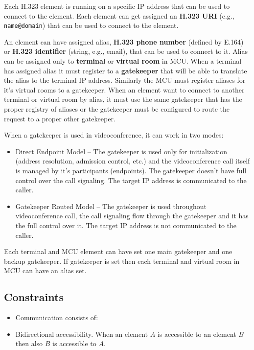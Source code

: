 Each H.323 element is running on a specific IP address that can be used to 
connect to the element. Each element can get assigned an \textbf{H.323 URI} (e.g., \verb|name@domain|) that can be used to connect to the element.

An element can have assigned alias, \textbf{H.323 
phone number} (defined by E.164) or \textbf{H.323 identifier} (string, e.g., 
email), that can be used to connect to it. Alias can be assigned only to \textbf{terminal} or \textbf{virtual room} in 
MCU. When a terminal has assigned alias it must register to a 
\textbf{gatekeeper} that will be able to translate the alias to the terminal 
IP address. Similarly the MCU must register aliases for it's virtual rooms to 
a gatekeeper. When an element want to connect to another terminal or virtual 
room by alias, it must use the same gatekeeper that has the proper registry 
of aliases or the gatekeeper must be configured to route the request to a 
proper other gatekeeper.

When a gatekeeper is used in videoconference, it can work in two modes:
\begin{itemize}
\item Direct Endpoint Model -- The gatekeeper is used only for initialization 
(address resolution, admission control, etc.) and the videoconference call 
itself is managed by it's participants (endpoints). The gatekeeper doesn't 
have full control over the call signaling. The target IP address is 
communicated to the caller.
\item Gatekeeper Routed Model -- The gatekeeper is used throughout 
videoconference call, the call signaling flow through the gatekeeper and it 
has the full control over it. The target IP address is not communicated to 
the caller.
\end{itemize}

Each terminal and MCU element can have set one main gatekeeper and one backup 
gatekeeper.  If gatekeeper is set then each terminal and virtual room in MCU 
can have an alias set.

\subsection{Constraints}

\begin{itemize}
\item Communication consists of:

\item Bidirectional accessibility. When an element $A$ is accessible to an 
element $B$ then also $B$ is accessible to $A$.
\end{itemize}

